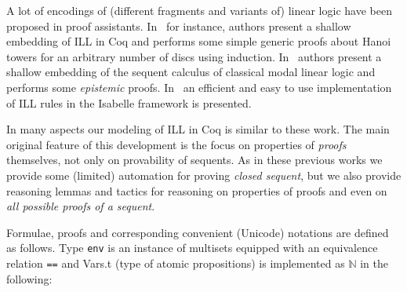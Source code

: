 \documentclass[runningheads,a4paper]{llncs}
\newcommand{\N}{\mathbb{N}}
\begin{document}
A lot of encodings of (different fragments and variants of) linear
logic have been proposed in proof assistants. In~\cite{Power99} for
instance, authors present a shallow embedding of ILL in Coq and
performs some simple generic proofs about Hanoi towers for an
arbitrary number of discs using induction.
In~\cite{Sadrzadeh03modallinear} authors present a shallow embedding
of the sequent calculus of classical modal linear logic and performs
some \emph{epistemic} proofs. In~\cite{Kalvala95mechanizinglinear} an
efficient and easy to use implementation of ILL rules in the Isabelle
framework is presented.

In many aspects our modeling of ILL in Coq is similar to these work.
The main original feature of this development is the focus on
properties of \emph{proofs} themselves, not only on provability of
sequents. As in these previous works we provide some (limited)
automation for proving \emph{closed sequent}, but we also provide reasoning lemmas and tactics
for reasoning on properties of proofs and even on \emph{all possible
  proofs of a sequent}. 


Formulae, proofs and corresponding convenient (Unicode) notations are
defined as follows. Type \texttt{env} is an instance of multisets
equipped with an equivalence relation \texttt{==} and Vars.t (type of
atomic propositions) is implemented as $\N$ in the following:
\end{document}
